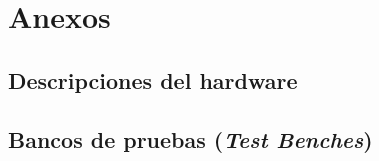 \section{Anexos}

\subsection{Descripciones del hardware}





\subsection{Bancos de pruebas (\textit{Test Benches})}




